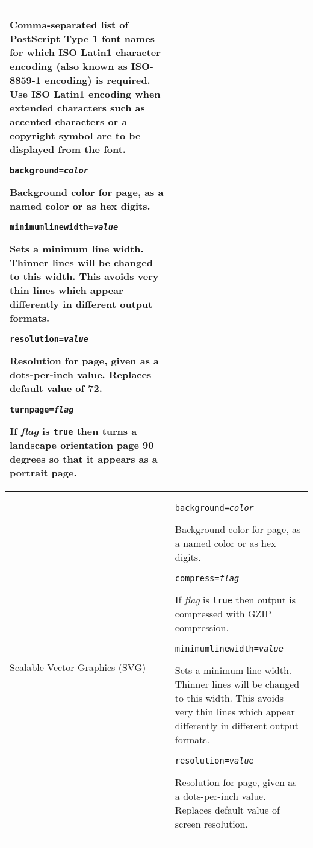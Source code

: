 \begin{longtable}{|p{4cm}|p{10cm}|}
Comma-separated list of PostScript Type 1 font names for
which ISO Latin1 character encoding
(also known as ISO-8859-1 encoding)
is required.  Use ISO Latin1 encoding
when extended characters such as accented characters
or a copyright symbol are to be displayed from the font.

\vspace{10pt}
\texttt{background=\textit{color}}

Background color for page, as a named color or as hex digits.

\vspace{10pt}
\texttt{minimumlinewidth=\textit{value}}

Sets a minimum line width.  Thinner lines will be changed to
this width.  This avoids very thin lines which appear differently
in different output formats.

\vspace{10pt}
\texttt{resolution=\textit{value}}

Resolution for page, given as a dots-per-inch value.  Replaces
default value of 72.

\vspace{10pt}
\texttt{turnpage=\textit{flag}}

If \textit{flag} is \texttt{true} then
turns a landscape orientation page 90 degrees so that it appears
as a portrait page. \\

\hline

Scalable Vector Graphics (SVG) &

\texttt{background=\textit{color}}

Background color for page, as a named color or as hex digits.

\vspace{10pt}
\texttt{compress=\textit{flag}}

If \textit{flag} is \texttt{true} then output is compressed with GZIP
compression.

\vspace{10pt}
\texttt{minimumlinewidth=\textit{value}}

Sets a minimum line width.  Thinner lines will be changed to
this width.  This avoids very thin lines which appear differently
in different output formats.

\vspace{10pt}
\texttt{resolution=\textit{value}}

Resolution for page, given as a dots-per-inch value.  Replaces
default value of screen resolution.


\end{longtable}
